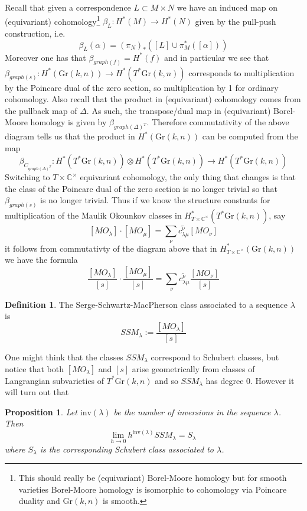\documentclass[12pt]{amsart}
\numberwithin{equation}{section}
\newtheorem{Proposition}[equation]{Proposition}
\theoremstyle{definition}
\newtheorem{Definition}[equation]{Definition}
\numberwithin{figure}{section}
\newcommand{\C}{\mathbb{C}}
\newcommand{\grass}[2]{\mathrm{Gr}(#1,#2)}
\begin{document}
Recall that given a correspondence $L\subset M\times N$ we have an induced map on (equivariant) cohomology\footnote{This should really be (equivariant) Borel-Moore homology but for smooth varieties Borel-Moore homology is isomorphic to cohomology via Poincare duality and $\grass{k}{n}$ is smooth.} $\beta_L: H^*(M)\to H^*(N)$ given by the pull-push construction, i.e.
\[  \beta_L(\alpha)=(\pi_N)_* ([L]\cup \pi^*_M([\alpha])) \]
Moreover one has that $\beta_{graph(f)}=H^*(f)$ and in particular we see that $\beta_{graph(s)}:H^*(\grass{k}{n})\to H^*(T^*\grass{k}{n})$ corresponds to multiplication by the Poincare dual of the zero section, so multiplication by 1 for ordinary cohomology. Also recall that the product in (equivariant) cohomology comes from the pullback map of $\Delta$. As such, the transpose/dual map in (equivariant) Borel-Moore homology is given by $\beta_{graph(\Delta)^T}$. Therefore commutativity of the above diagram tells us that the product in $H^*(\grass{k}{n})$ can be computed from the map
\[ \beta_{C_{graph(\Delta)^T}}:H^*( T^*\grass{k}{n})\otimes H^*(T^* \grass{k}{n} )\to H^*( T^*\grass{k}{n})  \]
Switching to $T\times \C^\times$ equivariant cohomology, the only thing that changes is that the class of the Poincare dual of the zero section is no longer trivial so that $\beta_{graph(s)}$ is no longer trivial. Thus if we know the structure constants for multiplication of the Maulik Okounkov classes in $H^*_{T\times \C^\times}( T^*\grass{k}{n})$, say
\[  [MO_\lambda]\cdot [MO_{\mu}]=\sum_\nu \widetilde{c^\nu_{\lambda \mu}} [MO_\nu] \]
it follows from commutativty of the diagram above that in $H^*_{T\times \C^\times}( \grass{k}{n})$ we have the formula
\[  \frac{[MO_\lambda]}{[s]}\cdot \frac{[MO_{\mu}]}{[s]}=\sum_\nu \widetilde{c^\nu_{\lambda \mu}} \frac{[MO_\nu]}{[s]} \]

\begin{Definition}
The Serge-Schwartz-MacPherson class associated to a sequence $\lambda$ is
\[ SSM_\lambda:= \frac{[MO_\lambda]}{[s]}  \]
\end{Definition}

One might think that the classes $SSM_\lambda$ correspond to Schubert classes, but notice that both $[MO_\lambda]$ and $[s]$ arise geometrically from classes of Langrangian subvarieties of $T^*\grass{k}{n}$ and so $SSM_\lambda$ has degree 0. However it will turn out that

\begin{Proposition}
Let $\mathrm{inv}(\lambda)$ be the number of inversions in the sequence $\lambda$. Then
\[  \underset{h\to 0}{\mathrm{lim}} \ h^{\mathrm{inv}(\lambda)} SSM_\lambda=S_\lambda \]
where $S_\lambda$ is the corresponding Schubert class associated to $\lambda$. 
\end{Proposition} 
\end{document}
